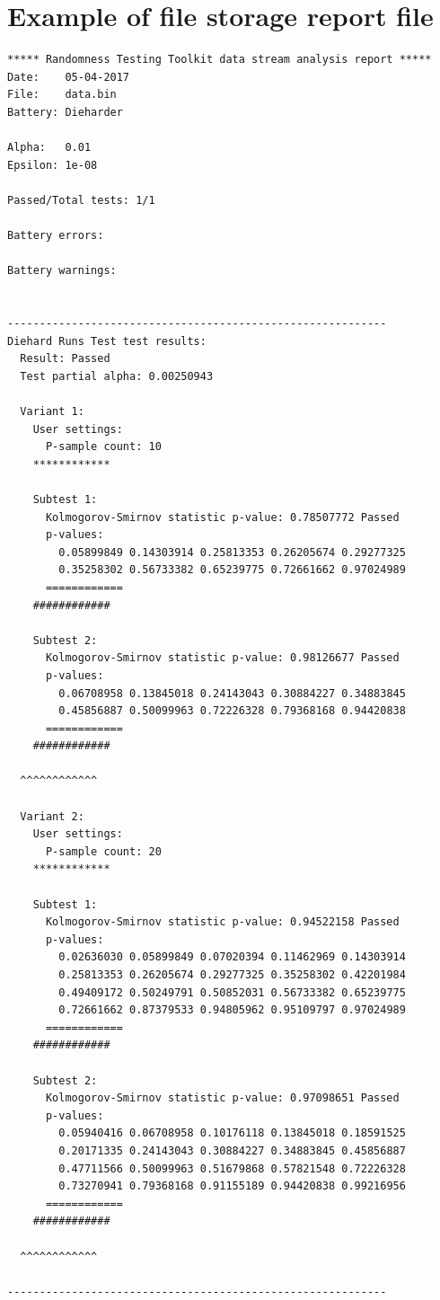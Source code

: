 \documentclass[
  digital,  	%
  color,		%
  oneside,   	%
  12pt,
  nocover,
  notable,
  nolof,
  nolot,
]{fithesis3}
\theoremstyle{definition}
\theoremstyle{remark}
\begin{document}
\chapter{Example of file storage report file}
\label{app:file_storage_report}
\begin{verbatim}
***** Randomness Testing Toolkit data stream analysis report *****
Date:    05-04-2017
File:    data.bin
Battery: Dieharder

Alpha:   0.01
Epsilon: 1e-08

Passed/Total tests: 1/1

Battery errors:

Battery warnings:


-----------------------------------------------------------
Diehard Runs Test test results:
  Result: Passed
  Test partial alpha: 0.00250943

  Variant 1:
    User settings: 
      P-sample count: 10
    ************

    Subtest 1:
      Kolmogorov-Smirnov statistic p-value: 0.78507772 Passed
      p-values: 
        0.05899849 0.14303914 0.25813353 0.26205674 0.29277325 
        0.35258302 0.56733382 0.65239775 0.72661662 0.97024989 
      ============
    ############

    Subtest 2:
      Kolmogorov-Smirnov statistic p-value: 0.98126677 Passed
      p-values: 
        0.06708958 0.13845018 0.24143043 0.30884227 0.34883845 
        0.45856887 0.50099963 0.72226328 0.79368168 0.94420838 
      ============
    ############

  ^^^^^^^^^^^^

  Variant 2:
    User settings: 
      P-sample count: 20
    ************

    Subtest 1:
      Kolmogorov-Smirnov statistic p-value: 0.94522158 Passed
      p-values: 
        0.02636030 0.05899849 0.07020394 0.11462969 0.14303914 
        0.25813353 0.26205674 0.29277325 0.35258302 0.42201984 
        0.49409172 0.50249791 0.50852031 0.56733382 0.65239775 
        0.72661662 0.87379533 0.94805962 0.95109797 0.97024989 
      ============
    ############

    Subtest 2:
      Kolmogorov-Smirnov statistic p-value: 0.97098651 Passed
      p-values: 
        0.05940416 0.06708958 0.10176118 0.13845018 0.18591525 
        0.20171335 0.24143043 0.30884227 0.34883845 0.45856887 
        0.47711566 0.50099963 0.51679868 0.57821548 0.72226328 
        0.73270941 0.79368168 0.91155189 0.94420838 0.99216956 
      ============
    ############

  ^^^^^^^^^^^^

-----------------------------------------------------------
\end{verbatim}
\end{document}
